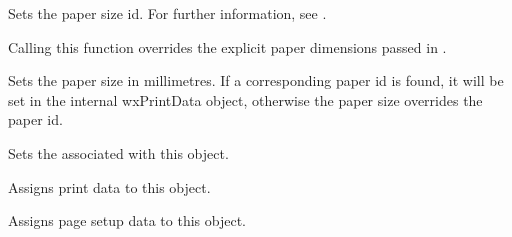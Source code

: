 \label{wxpagesetupdialogdatasetpaperid}


Sets the paper size id. For further information, see .

Calling this function overrides the explicit paper dimensions passed in .

\label{wxpagesetupdialogdatasetpapersize}


Sets the paper size in millimetres. If a corresponding paper id is found, it will be set in the
internal wxPrintData object, otherwise the paper size overrides the paper id.

\label{wxpagesetupdialogdatasetprintdata}


Sets the  associated with this object.

\label{wxpagesetupdialogdataassign}


Assigns print data to this object.


Assigns page setup data to this object.

